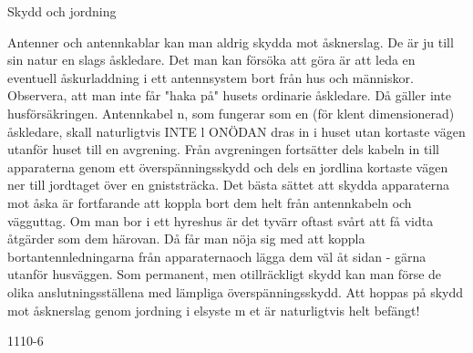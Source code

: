 Skydd och jordning

Antenner och antennkablar kan man aldrig
skydda mot åsknerslag. De är ju till sin natur
en slags åskledare. Det man kan försöka att
göra är att leda en eventuell åskurladdning i
ett antennsystem bort från hus och människor. Observera, att man inte får "haka på"
husets ordinarie åskledare. Då gäller inte
husförsäkringen.
Antennkabel n, som fungerar som en (för
klent dimensionerad) åskledare, skall naturligtvis INTE l ONÖDAN dras in i huset utan
kortaste vägen utanför huset till en avgrening.
Från avgreningen fortsätter dels kabeln
in till apparaterna genom ett överspänningsskydd och dels en jordlina kortaste vägen
ner till jordtaget över en gniststräcka. Det
bästa sättet att skydda apparaterna mot
åska är fortfarande att koppla bort dem helt
från antennkabeln och vägguttag.
Om man bor i ett hyreshus är det tyvärr
oftast svårt att få vidta åtgärder som dem
härovan. Då får man nöja sig med att koppla
bortantennledningarna från apparaternaoch
lägga dem väl åt sidan - gärna utanför
husväggen.
Som permanent, men otillräckligt skydd
kan man förse de olika anslutningsställena
med lämpliga överspänningsskydd.
Att hoppas på skydd mot åsknerslag genom jordning i elsyste m et är naturligtvis helt
befängt!

1110-6
